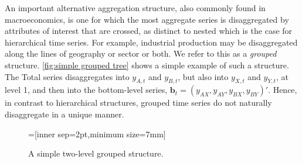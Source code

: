\documentclass[graybox]{svmult}
\begin{document}
An important alternative aggregation structure, also commonly found in macroeconomics, is one for which the most aggregate series is disaggregated by attributes of interest that are crossed, as distinct to nested which is the case for hierarchical time series. For example, industrial production may be disaggregated along the lines of geography or sector or both. We refer to this as a \textit{grouped} structure. \autoref{fig:simple grouped tree} shows a simple example of such a structure. The Total series disaggregates into $y_{A,t}$ and $y_{B,t}$, but also into $y_{X,t}$ and $y_{Y,t}$, at level 1, and then into the bottom-level series, $\bm{b}_t=(y_{AX}, y_{AY}, y_{BX}, y_{BY})'$. Hence, in contrast to hierarchical structures, grouped time series do not naturally disaggregate in a unique manner.

\begin{figure}[!hbt]\sidecaption\centering
	=[inner sep=2pt,minimum size=7mm]
  \caption{A simple two-level grouped structure.}
  \label{fig:simple grouped tree}
\end{figure}
\end{document}

